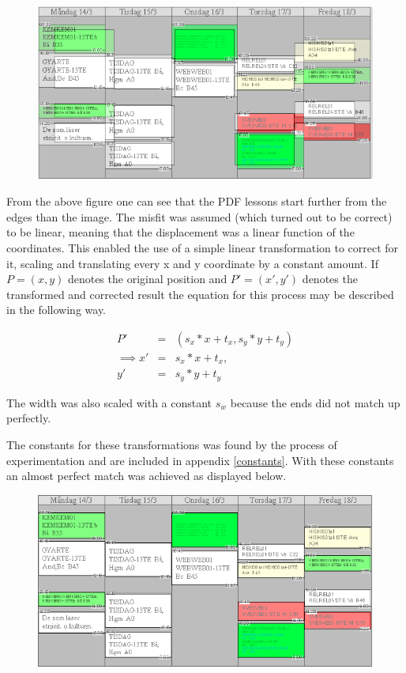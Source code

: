 \documentclass{article}
\begin{document}
	\begin{figure}[h]
		\centering
		\includegraphics[width=0.7\linewidth]{images/pdf-image-mismatch}
		\caption{}
		\label{fig:pdf-image-mismatch}
	\end{figure}
	
	From the above figure one can see that the PDF lessons start further from the edges than the image. The misfit was assumed (which turned out to be correct) to be linear, meaning that the displacement was a linear function of the coordinates. This enabled the use of a simple linear transformation to correct for it, scaling and translating every x and y coordinate by a constant amount. If $P = (x, y)$ denotes the original position and $P' = (x', y')$ denotes the transformed and corrected result the equation for this process may be described in the following way.
	
	\begin{eqnarray}
		P' &=& (s_x*x + t_x, s_y*y + t_y)\nonumber\\
		\implies x' &=& s_x*x + t_x, \nonumber\\
		y' &=& s_y*y + t_y \nonumber
	\end{eqnarray}
	
	The width was also scaled with a constant $s_w$ because the ends did not match up perfectly.
	
	The constants for these transformations was found by the process of experimentation and are included in appendix \ref{constants}. With these constants an almost perfect match was achieved as displayed below.
	
	\begin{figure}[h]
		\centering
		\includegraphics[width=0.7\linewidth]{images/pdf-image-match}
		\caption{}
		\label{fig:pdf-image-match}
	\end{figure}
	
\end{document}
